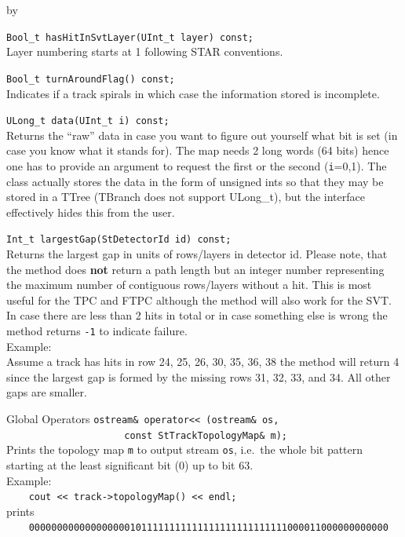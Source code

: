 \documentclass[twoside]{article}
\newcommand{\entrylabel}[1]{\mbox{\textbf{{#1}}}\hfil}%
\newenvironment{entry}
{\begin{list}{}%
    {\renewcommand{\makelabel}{\entrylabel}%
     \setlength{\labelwidth}{90pt}%
     \setlength{\leftmargin}{\labelwidth}
     \advance\leftmargin by \labelsep%
      }%
    }%
  {\end{list}}
\newcommand{\Entrylabel}[1]%
{\raisebox{0pt}[1ex][0pt]{\makebox[\labelwidth][l]%
    {\parbox[t]{\labelwidth}{\hspace{0pt}\textbf{{#1}}}}}}
\newenvironment{Entry}%
{\renewcommand{\entrylabel}{\Entrylabel}\begin{entry}}%
  {\end{entry}}
\begin{document}
\begin{Entry}
    \verb+Bool_t hasHitInSvtLayer(UInt_t layer) const;+\\
    Layer numbering starts at 1 following STAR conventions.    

    \verb+Bool_t turnAroundFlag() const;+\\
    Indicates if a track spirals in which case the information stored
    is incomplete. 
    
    \verb+ULong_t data(UInt_t i) const;+\\
    Returns the ``raw'' data in case you want to figure out yourself
    what bit is set (in case you know what it stands for). The map
    needs 2 long words (64 bits) hence one has to provide an argument
    to request the first or the second (\texttt{i}=0,1). The class
    actually stores the data in the form of unsigned ints so that they
    may be stored in a TTree (TBranch does not support ULong\_t),
    but the interface effectively hides this from the user.

    \verb+Int_t largestGap(StDetectorId id) const;+\\  
    Returns the largest gap in units of rows/layers in detector id.
    Please note, that the method does \textbf{not} return a path length
    but an integer number representing the maximum number of contiguous rows/layers
    without a hit. This is most useful for the
    TPC and FTPC although the method will also work for the SVT.
    In case there are less than 2 hits in total or in case something
    else is wrong the method returns \texttt{-1} to indicate failure.\\
    Example: \\
    Assume a track has hits in row 24, 25, 26, 30, 35, 36, 38
    the method will return 4 since the largest gap is formed by the
    missing rows 31, 32, 33, and 34. All other gaps are smaller.
    
\item[Global Operators]
    \verb+ostream& operator<< (ostream& os, +\\
    \verb+                     const StTrackTopologyMap& m);+\\
    Prints the topology map \texttt{m} to output stream \texttt{os}, i.e.~the whole
    bit pattern starting at the least significant bit (0) up to bit 63.\\
    Example:\\
    {\footnotesize
        \verb+    cout << track->topologyMap() << endl;+\\
    }
    prints\\
    {\footnotesize
        \verb+    0000000000000000001011111111111111111111111111000011000000000000+\\
    }
\end{Entry}
\clearpage
\end{document}
